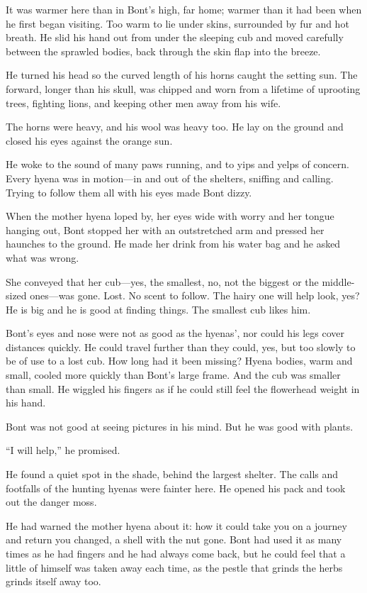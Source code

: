 It was warmer here than in Bont's high, far home; warmer than it had been when he first began visiting. Too warm to lie under skins, surrounded by fur and hot breath. He slid his hand out from under the sleeping cub and moved carefully between the sprawled bodies, back through the skin flap into the breeze.

He turned his head so the curved length of his horns caught the setting sun. The forward, longer than his skull, was chipped and worn from a lifetime of uprooting trees, fighting lions, and keeping other men away from his wife.

The horns were heavy, and his wool was heavy too. He lay on the ground and closed his eyes against the orange sun.

\secdiv

He woke to the sound of many paws running, and to yips and yelps of concern. Every hyena was in motion---in and out of the shelters, sniffing and calling. Trying to follow them all with his eyes made Bont dizzy.

When the mother hyena loped by, her eyes wide with worry and her tongue hanging out, Bont stopped her with an outstretched arm and pressed her haunches to the ground. He made her drink from his water bag and he asked what was wrong.

She conveyed that her cub---yes, the smallest, no, not the biggest or the middle-sized ones---was gone. Lost. No scent to follow. The hairy one will help look, yes? He is big and he is good at finding things. The smallest cub likes him.

Bont's eyes and nose were not as good as the hyenas', nor could his legs cover distances quickly. He could travel further than they could, yes, but too slowly to be of use to a lost cub. How long had it been missing? Hyena bodies, warm and small, cooled more quickly than Bont's large frame. And the cub was smaller than small. He wiggled his fingers as if he could still feel the flowerhead weight in his hand.

Bont was not good at seeing pictures in his mind. But he was good with plants.

``I will help,'' he promised.

He found a quiet spot in the shade, behind the largest shelter. The calls and footfalls of the hunting hyenas were fainter here. He opened his pack and took out the danger moss.

He had warned the mother hyena about it: how it could take you on a journey and return you changed, a shell with the nut gone. Bont had used it as many times as he had fingers and he had always come back, but he could feel that a little of himself was taken away each time, as the pestle that grinds the herbs grinds itself away too.

